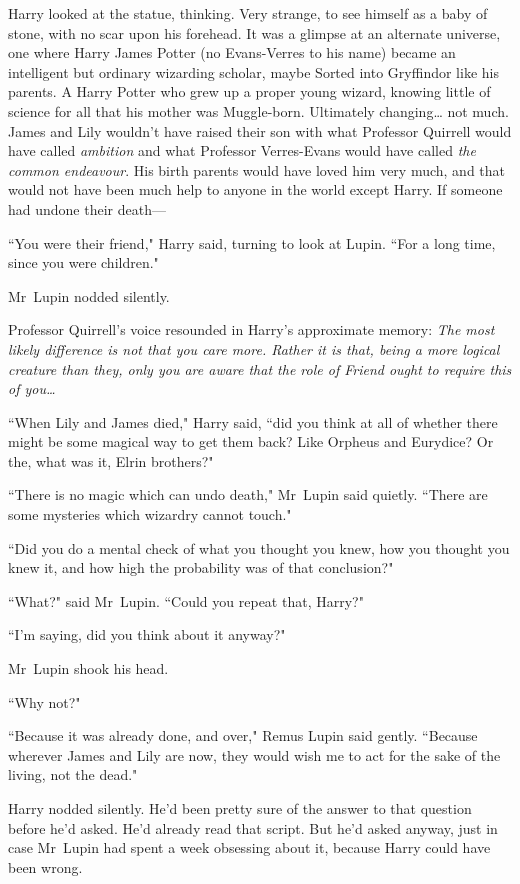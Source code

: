 Harry looked at the statue, thinking. Very strange, to see himself as a baby of stone, with no scar upon his forehead. It was a glimpse at an alternate universe, one where Harry James Potter (no Evans-Verres to his name) became an intelligent but ordinary wizarding scholar, maybe Sorted into Gryffindor like his parents. A Harry Potter who grew up a proper young wizard, knowing little of science for all that his mother was Muggle-born. Ultimately changing{\ldots} not much. James and Lily wouldn't have raised their son with what Professor Quirrell would have called \emph{ambition} and what Professor Verres-Evans would have called \emph{the common endeavour}. His birth parents would have loved him very much, and that would not have been much help to anyone in the world except Harry. If someone had undone their death—

``You were their friend," Harry said, turning to look at Lupin. ``For a long time, since you were children."

Mr~Lupin nodded silently.

Professor Quirrell's voice resounded in Harry's approximate memory: \emph{The most likely difference is not that you care more. Rather it is that, being a more logical creature than they, only you are aware that the role of Friend ought to require this of you{\ldots}}

``When Lily and James died," Harry said, ``did you think at all of whether there might be some magical way to get them back? Like Orpheus and Eurydice? Or the, what was it, Elrin brothers?"

``There is no magic which can undo death," Mr~Lupin said quietly. ``There are some mysteries which wizardry cannot touch."

``Did you do a mental check of what you thought you knew, how you thought you knew it, and how high the probability was of that conclusion?"

``What?" said Mr~Lupin. ``Could you repeat that, Harry?"

``I'm saying, did you think about it anyway?"

Mr~Lupin shook his head.

``Why not?"

``Because it was already done, and over," Remus Lupin said gently. ``Because wherever James and Lily are now, they would wish me to act for the sake of the living, not the dead."

Harry nodded silently. He'd been pretty sure of the answer to that question before he'd asked. He'd already read that script. But he'd asked anyway, just in case Mr~Lupin had spent a week obsessing about it, because Harry could have been wrong.

